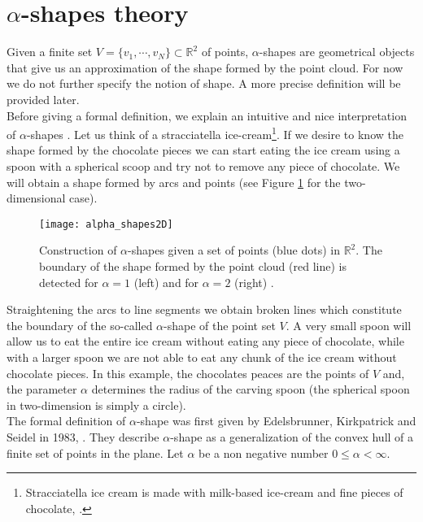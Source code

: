 \section{$\alpha$-shapes theory}\label{sec:alpha-shapes}
Given a finite set $V = \{v_1, \cdots, v_N\}\subset \mathbb{R}^2$ of points, $\alpha$-shapes are geometrical objects that give us an approximation of the shape formed by the point cloud. For now we do not further specify the notion of shape. A more precise definition will be provided later.\\ \indent
Before giving a formal definition, we explain an intuitive and nice interpretation of $\alpha$-shapes \cite{lucieer2004alpha}. 
Let us think of a stracciatella ice-cream\footnote{Stracciatella ice cream is made with milk-based ice-cream and fine pieces of chocolate, \cite{Wiki3}.}. If we desire to know the shape formed by the chocolate pieces we can start eating the ice cream using a spoon with a spherical scoop and try not to remove any piece of chocolate. 
We will obtain a shape formed by arcs and points (see Figure \ref{fig:shape2d} for the two-dimensional case).
\begin{figure}[t]\label{fig:shape2d}
\begin{center}
\texttt{[image: alpha\_shapes2D]}
\label{fig:shape}
\caption{Construction of $\alpha$-shapes given a set of points (blue dots) in $\mathbb{R}^2$. The boundary of the shape formed by the point cloud (red line) is detected for $\alpha = 1$ (left) and for $\alpha=2$ (right) \cite{sabel2017application}.}
\label{fig:shape2d}
\end{center}
\end{figure}
Straightening the arcs to line segments we obtain broken lines which constitute the boundary of the so-called $\alpha$-shape of the point set $V$. 
A very small spoon will allow us to eat the entire ice cream without eating any piece of chocolate, while with a larger spoon we are not able to eat any chunk of the ice cream without chocolate pieces. In this example, the chocolates peaces are the points of $V$ and, the parameter $\alpha$ determines the radius of the carving spoon (the spherical spoon in two-dimension is simply a circle).\\ \indent 
The formal definition of $\alpha$-shape was first given by Edelsbrunner, Kirkpatrick and Seidel in 1983, \cite{edelsbrunner1983shape}. They describe $\alpha$-shape as a generalization of the convex hull of a finite set of points in the plane. Let $\alpha$ be a non negative number $0\leq\alpha<\infty$. 
